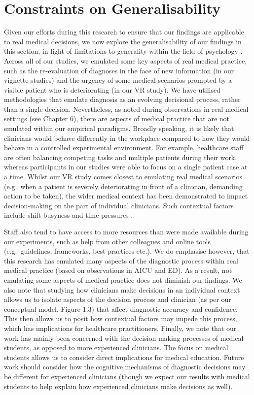 \documentclass[a4paper, nobind]{templates/ociamthesis}
\begin{document}
\section{Constraints on Generalisability}\label{constraints-on-generalisability}

Given our efforts during this research to ensure that our findings are applicable to real medical decisions, we now explore the generalisability of our findings in this section, in light of limitations to generality within the field of psychology \autocite{yarkoni_generalizability_2022}. Across all of our studies, we emulated some key aspects of real medical practice, such as the re-evaluation of diagnoses in the face of new information (in our vignette studies) and the urgency of some medical scenarios prompted by a visible patient who is deteriorating (in our VR study). We have utilised methodologies that emulate diagnosis as an evolving decisional process, rather than a single decision. Nevertheless, as noted during observations in real medical settings (see Chapter 6), there are aspects of medical practice that are not emulated within our empirical paradigms. Broadly speaking, it is likely that clinicians would behave differently in the workplace compared to how they would behave in a controlled experimental environment. For example, healthcare staff are often balancing competing tasks and multiple patients during their work, whereas participants in our studies were able to focus on a single patient case at a time. Whilst our VR study comes closest to emulating real medical scenarios (e.g.~when a patient is severely deteriorating in front of a clinician, demanding action to be taken), the wider medical context has been demonstrated to impact decision-making on the part of individual clinicians. Such contextual factors include shift busyness and time pressures \autocite{yang_effect_2012,soares_accuracy_2019,gupta_associations_2023}.

\hfill\break
Staff also tend to have access to more resources than were made available during our experiments, such as help from other colleagues and online tools (e.g.~guidelines, frameworks, best practices etc.). We do emphasise however, that this research has emulated many aspects of the diagnostic process within real medical practice (based on observations in AICU and ED). As a result, not emulating some aspects of medical practice does not diminish our findings. We also note that studying how clinicians make decisions in an individual context allows us to isolate aspects of the decision process and clinician (as per our conceptual model, Figure 1.3) that affect diagnostic accuracy and confidence. This then allows us to posit how contextual factors may impede this process, which has implications for healthcare practitioners. Finally, we note that our work has mainly been concerned with the decision making processes of medical students, as opposed to more experienced clinicians. The focus on medical students allows us to consider direct implications for medical education. Future work should consider how the cognitive mechanisms of diagnostic decisions may be different for experienced clinicians (though we expect our results with medical students to help explain how experienced clinicians make decisions as well).
\end{document}
